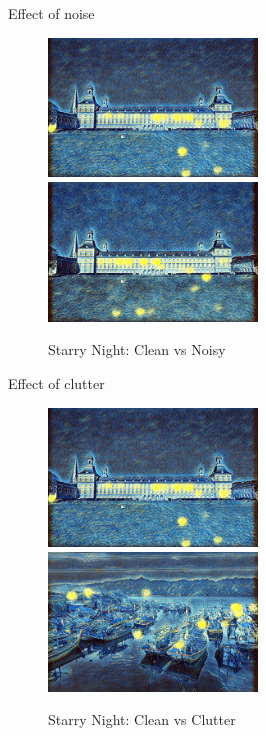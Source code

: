 \documentclass{beamer}
\begin{document}
    \begin{frame}{Effect of noise}

        \begin{figure}
            \includegraphics[width=0.495\textwidth]{clean}
            \hfill
            \includegraphics[width=0.495\textwidth]{noisy}
            \caption{\label{fig:noisy}Starry Night: Clean vs Noisy}
        \end{figure}

    \end{frame}

    \begin{frame}{Effect of clutter}

        \begin{figure}
            \includegraphics[width=0.495\textwidth]{clean}
            \hfill
            \includegraphics[width=0.495\textwidth]{clutter}
            \caption{\label{fig:clutter}Starry Night: Clean vs Clutter}
        \end{figure}

    \end{frame}
\end{document}
